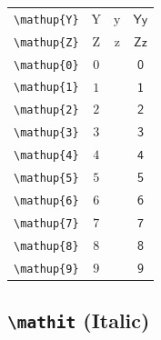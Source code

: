 \documentclass[12pt,a4paper]{article}
\begin{document}
\begin{longtable}{|c|c|c|c|}
\verb|\mathup{Y}| & $\mathup{Y}$ & $\mathup{y}$ & $ 𝖸 𝗒 $ \\
\verb|\mathup{Z}| & $\mathup{Z}$ & $\mathup{z}$ & $ 𝖹 𝗓 $ \\
\verb|\mathup{0}| & $\mathup{0}$ & & $ 𝟢 $ \\
\verb|\mathup{1}| & $\mathup{1}$ & & $ 𝟣 $ \\
\verb|\mathup{2}| & $\mathup{2}$ & & $ 𝟤 $ \\
\verb|\mathup{3}| & $\mathup{3}$ & & $ 𝟥 $ \\
\verb|\mathup{4}| & $\mathup{4}$ & & $ 𝟦 $ \\
\verb|\mathup{5}| & $\mathup{5}$ & & $ 𝟧 $ \\
\verb|\mathup{6}| & $\mathup{6}$ & & $ 𝟨 $ \\
\verb|\mathup{7}| & $\mathup{7}$ & & $ 𝟩 $ \\
\verb|\mathup{8}| & $\mathup{8}$ & & $ 𝟪 $ \\
\verb|\mathup{9}| & $\mathup{9}$ & & $ 𝟫 $ \\
\hline
\end{longtable}

\newpage

\subsection*{\texttt{\textbackslash{}mathit} (Italic)}
\end{document}
